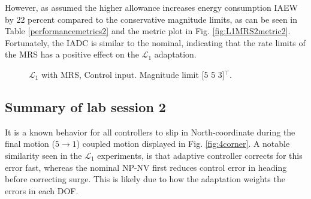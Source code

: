However, as assumed the higher allowance increases energy consumption IAEW by 22 percent compared to the conservative magnitude limits, as can be seen in Table \ref{performancemetrics2} and the metric plot in Fig. \ref{fig:L1MRS2metric2}. Fortunately, the IADC is similar to the nominal, indicating that the rate limits of the MRS has a positive effect on the $\mathcal{L}_1$ adaptation.

\begin{figure}[!h]
    \centering
    \caption{$\mathcal{L}_1$ with MRS, Control input. Magnitude limit [5 5 3]$^\top{}$.}
\end{figure}\label{fig:L1MRS24tau2}

\newpage

\subsection{Summary of lab session 2}
It is a known behavior for all controllers to slip in North-coordinate during the final motion ($5 \xrightarrow{} 1$) coupled motion displayed in Fig. \ref{fig:4corner}. A notable similarity seen in the $\mathcal{L}_1$ experiments, is that adaptive controller corrects for this error fast, whereas the nominal NP-NV first reduces control error in heading before correcting surge. This is likely due to how the adaptation weights the errors in each DOF. 

